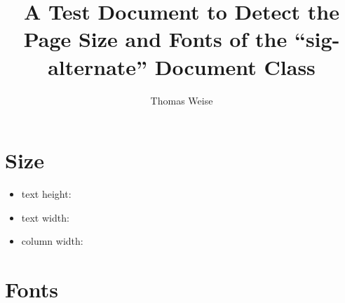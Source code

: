 \documentclass{sig-alternate}%
\begin{document}
%
%
\title{A Test Document to Detect the Page Size and Fonts of the ``sig-alternate'' Document Class}%
\author{Thomas Weise}%
%
\maketitle%
%
%
\section{Size}%
%
\begin{itemize}%
\item text height: \the\textheight%
\item text width: \the\textwidth%
\item column width: \the\columnwidth%
\end{itemize}%
%
\section{Fonts}%
%
\end{document}
